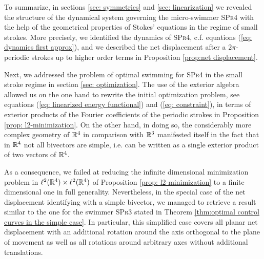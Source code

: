 To summarize, in sections \ref{sec: symmetries} and \ref{sec: linearization} we revealed the structure of the dynamical system governing the micro-swimmer \textsc{SPr4} with the help of the geometrical properties of Stokes' equations in the regime of small strokes. More precisely, we identified the dynamics of \textsc{SPr4}, c.f. equations (\ref{eq: dynamics first approx}), and we described the net displacement after a $2\pi$-periodic strokes up to higher order terms in Proposition \ref{prop:net displacement}. 

Next, we addressed the problem of optimal swimming for \textsc{SPr4} in the small stroke regime in section \ref{sec: optimization}. The use of the exterior algebra allowed us on the one hand to rewrite the initial optimization problem, see equations (\ref{eq: linearized energy functional}) and (\ref{eq: constraint}), in terms of exterior products of the Fourier coefficients of the periodic strokes in Proposition \ref{prop: l2-minimization}. On the other hand, in doing so, the considerably more complex geometry of $\mathbb{R}^4$ in comparison with $\mathbb{R}^3$ manifested itself in the fact that in $\mathbb{R}^4$ not all bivectors are simple, i.e. can be written as a single exterior product of two vectors of $\mathbb{R}^4$.

As a consequence, we failed at reducing the infinite dimensional minimization problem in $\ell^2(\mathbb{R}^4) \times \ell^2(\mathbb{R}^4)$ of Proposition \ref{prop: l2-minimization} to a finite dimensional one in full generality. Nevertheless, in the special case of the net displacement identifying with a simple bivector, we managed to retrieve a result similar to the one for the swimmer \textsc{SPr3} stated in Theorem \ref{thm:optimal control curves in the simple case}. In particular, this simplified case covers all planar net displacement with an additional rotation around the axis orthogonal to the plane of movement as well as all rotations around arbitrary axes without additional translations.

